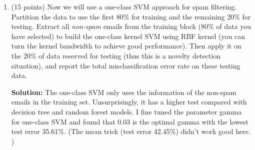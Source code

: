 \documentclass[twoside,10pt]{article}
\begin{document}
\begin{enumerate}
\begin{enumerate}
\item (15 points) Now we will use a one-class SVM approach for spam filtering. Partition the data to use the first 80\% for training and the remaining 20\% for testing. Extract all {\it non-spam} emails from the training block (80\% of data you have selected) to build the one-class kernel SVM using RBF kernel (you can turn the kernel bandwidth to achieve good performance). Then apply it on the 20\% of data reserved for testing (thus this is a novelty detection situation), and report the total misclassification error rate on these testing data. 
\begin{tcolorbox}
\textbf{Solution:}
The one-class SVM only uses the information of the non-spam emails in the training set. Unsurprisingly, it has a higher test compared with decision tree and random forest models. I fine tuned the parameter gamma for one-class SVM and found that 0.03 is the optimal gamma with the lowest test error 35.61\%. (The mean trick (test error 42.45\%) didn't work good here. )
\end{tcolorbox}

\end{enumerate}


\end{enumerate}
\end{document}
